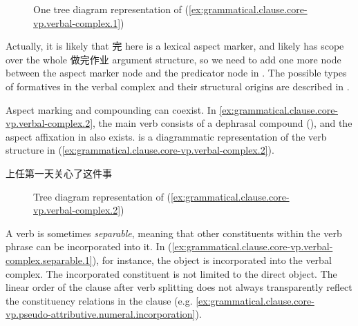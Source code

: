 \documentclass[UTF8, a4paper, oneside, scheme=plain, 12pt]{ctexrep}
\begin{document}
\begin{figure}[H]
    \centering
    {
        \small
        
    }
    \caption{One tree diagram representation of (\ref{ex:grammatical.clause.core-vp.verbal-complex.1})}
    \label{fig:grammatical.clause.core-vp.verbal-complex.1.1}
\end{figure}

Actually, it is likely that 完 here is a lexical aspect marker,
and likely has scope over the whole 做完作业 argument structure,
so we need to add one more node between the aspect marker node
and the predicator node in .
The possible types of formatives in the verbal complex
and their structural origins are described in .

Aspect marking and compounding can coexist.
In \ref{ex:grammatical.clause.core-vp.verbal-complex.2},
the main verb consists of a dephrasal compound (),
and the aspect affixation in  also exists.
is a diagrammatic representation of the verb structure in (\ref{ex:grammatical.clause.core-vp.verbal-complex.2}).


\begin{exe}
    \ex\label{ex:grammatical.clause.core-vp.verbal-complex.2} 上任第一天关心了这件事
\end{exe}

\begin{figure}[H]
    {
        \centering
        \small
        
    }
    \caption{Tree diagram representation of (\ref{ex:grammatical.clause.core-vp.verbal-complex.2})}
    \label{fig:grammatical.clause.core-vp.verbal-complex.2}
\end{figure}

A verb is sometimes \emph{separable},
meaning that other constituents within the verb phrase can be incorporated into it.
In (\ref{ex:grammatical.clause.core-vp.verbal-complex.separable.1}),
for instance, the object is incorporated into the verbal complex.
The incorporated constituent is not limited to the direct object.
The linear order of the clause after verb splitting
does not always transparently reflect the constituency relations in the clause
(e.g. \ref{ex:grammatical.clause.core-vp.pseudo-attributive.numeral.incorporation}).
\end{document}
